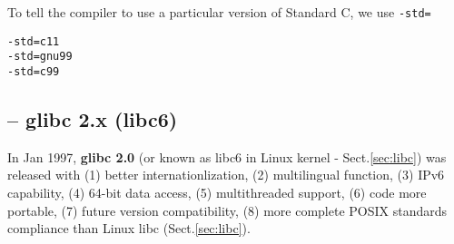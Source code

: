 To tell the compiler to use a particular version of Standard C, we use \verb!-std=!
\begin{verbatim}
-std=c11
-std=gnu99
-std=c99
\end{verbatim}


\subsection{-- glibc 2.x (libc6)}
\label{sec:glibc-2.0}
\label{sec:glibc-2.x}

In Jan 1997, {\bf glibc 2.0} (or known as libc6 in Linux kernel -
Sect.\ref{sec:libc}) was released with (1) better internationlization, (2)
multilingual function, (3) IPv6 capability, (4) 64-bit data access, (5)
multithreaded support, (6) code more portable, (7) future version compatibility,
(8) more complete POSIX standards compliance than Linux libc
(Sect.\ref{sec:libc}).

